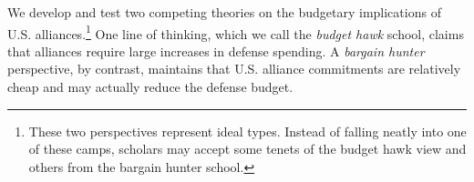 We develop and test two competing theories on the budgetary implications of U.S. alliances.\footnote{These two perspectives represent ideal types. Instead of falling neatly into one of these camps, scholars may accept some tenets of the budget hawk view and others from the bargain hunter school.} One line of thinking, which we call the \textit{budget hawk} school, claims that alliances require large increases in defense spending. A \textit{bargain hunter} perspective, by contrast, maintains that U.S. alliance commitments are relatively cheap and may actually reduce the defense budget.  

